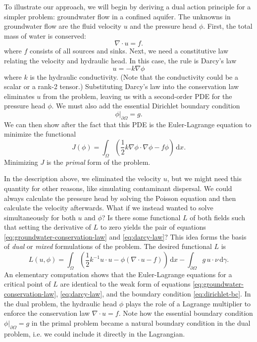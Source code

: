 \documentclass{article}
\theoremstyle{definition}
\theoremstyle{plain}
\newcommand{\ud}{\hspace{2pt}\mathrm{d}}
\begin{document}
To illustrate our approach, we will begin by deriving a dual action principle for a simpler problem: groundwater flow in a confined aquifer.
The unknowns in groundwater flow are the fluid velocity $u$ and the pressure head $\phi$.
First, the total mass of water is conserved:
\begin{equation}
    \nabla\cdot u = f.
    \label{eq:groundwater-conservation-law}
\end{equation}
where $f$ consists of all sources and sinks.
Next, we need a constitutive law relating the velocity and hydraulic head.
In this case, the rule is Darcy's law
\begin{equation}
    u = -k\nabla\phi
    \label{eq:darcy-law}
\end{equation}
where $k$ is the hydraulic conductivity.
(Note that the conductivity could be a scalar or a rank-2 tensor.)
Substituting Darcy's law into the conservation law eliminates $u$ from the problem, leaving us with a second-order PDE for the pressure head $\phi$.
We must also add the essential Dirichlet boundary condition
\begin{equation}
    \phi|_{\partial\Omega} = g.
    \label{eq:dirichlet-bc}
\end{equation}
We can then show after the fact that this PDE is the Euler-Lagrange equation to minimize the functional
\begin{equation}
    J(\phi) = \int_\Omega\left(\frac{1}{2}k\nabla\phi\cdot\nabla\phi - f\phi\right)\ud x.
\end{equation}
Minimizing $J$ is the \emph{primal} form of the problem.

In the description above, we eliminated the velocity $u$, but we might need this quantity for other reasons, like simulating contaminant dispersal.
We could always calculate the pressure head by solving the Poisson equation and then calculate the velocity afterwards.
What if we instead wanted to solve simultaneously for both $u$ and $\phi$?
Is there some functional $L$ of both fields such that setting the derivative of $L$ to zero yields the pair of equations \eqref{eq:groundwater-conservation-law} and \eqref{eq:darcy-law}?
This idea forms the basis of \emph{dual} or \emph{mixed} formulations of the problem.
The desired functional $L$ is
\begin{equation}
    L(u, \phi) = \int_\Omega\left(\frac{1}{2}k^{-1}u\cdot u - \phi\left(\nabla\cdot u - f\right)\right)\ud x - \int_{\partial\Omega}g\, u\cdot \nu\ud\gamma.
\end{equation}
An elementary computation shows that the Euler-Lagrange equations for a critical point of $L$ are identical to the weak form of equations \eqref{eq:groundwater-conservation-law}, \eqref{eq:darcy-law}, and the boundary condition \eqref{eq:dirichlet-bc}.
In the dual problem, the hydraulic head $\phi$ plays the role of a Lagrange multiplier to enforce the conservation law $\nabla\cdot u = f$.
Note how the essential boundary condition $\phi|_{\partial\Omega} = g$ in the primal problem became a natural boundary condition in the dual problem, i.e. we could include it directly in the Lagrangian.
\end{document}
